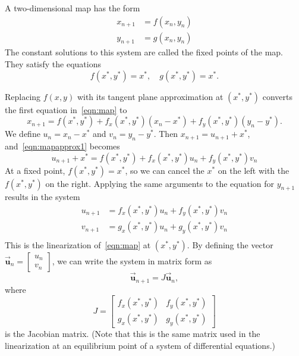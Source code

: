 \documentclass[reqno]{immbook}
\newcommand{\BU}{\vec{\textbf{u}}}
\begin{document}
A two-dimensional map has the form
\begin{equation}
\begin{split}
  x_{n+1} & = f(x_n,y_n) \\
  y_{n+1} & = g(x_n,y_n)
\end{split}
\label{eqn:map}
\end{equation}
The constant solutions to this system are called the fixed points
of the map.
They satisfy the equations
\begin{equation}
    f(x^*,y^*) = x^*, \quad g(x^*,y^*) = x^*.
\end{equation}

Replacing $f(x,y)$ with its tangent plane
approximation at $(x^*,y^*)$ converts the first equation in~\eqref{eqn:map}
to
\begin{equation}
  x_{n+1} = f(x^*,y^*) + f_x(x^*,y^*)(x_n-x^*) + f_y(x^*,y^*)(y_n-y^*).
\label{eqn:mapapprox1}
\end{equation}
We define $u_n = x_n - x^*$ and
$v_n = y_n - y^*$.  Then $x_{n+1} = u_{n+1} + x^*$, and~\eqref{eqn:mapapprox1}
becomes
\begin{equation}
   u_{n+1} + x^* = f(x^*,y^*) + f_x(x^*,y^*)u_n + f_y(x^*,y^*)v_n
\end{equation}
At a fixed point, $f(x^*,y^*) = x^*$, so we can cancel the $x^*$ on the
left with the $f(x^*,y^*)$ on the right.  Applying the same arguments
to the equation for $y_{n+1}$ results in the system
\begin{equation}
\begin{split}
   u_{n+1} & = f_x(x^*,y^*)u_n + f_y(x^*,y^*)v_n \\
   v_{n+1} & = g_x(x^*,y^*)u_n + g_y(x^*,y^*)v_n \\
\end{split}
\end{equation}
This is the linearization
of~\eqref{eqn:map} at $(x^*,y^*)$.
By defining the vector $\BU_n = \begin{bmatrix} u_n \\ v_n \end{bmatrix}$,
we can write the system in matrix form as
\begin{equation}
  \BU_{n+1} = J\BU_n,
\label{eqn:linearizedmap}
\end{equation}
where
\begin{equation}
   J = \begin{bmatrix}
             f_x(x^*,y^*) & f_y(x^*,y^*) \\
	     g_x(x^*,y^*) & g_y(x^*,y^*)
       \end{bmatrix}
\label{eqn:mapjac}
\end{equation}
is the Jacobian matrix.
(Note that this is the same matrix used in the linearization
at an equilibrium point of a system of differential equations.)
\end{document}
